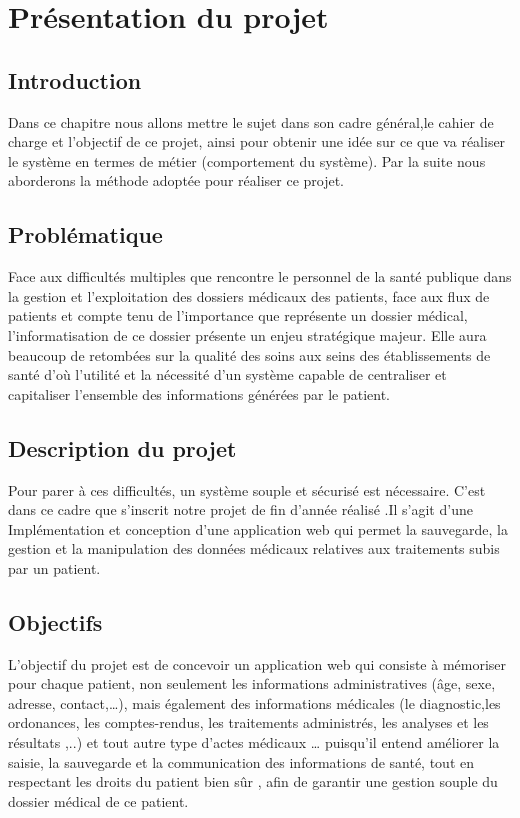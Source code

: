 \chapter{Présentation du projet}

\section{Introduction}

Dans ce chapitre nous allons mettre le sujet dans son cadre général,le cahier de charge  et l’objectif de ce projet, ainsi pour obtenir une idée sur ce que va réaliser le système en termes de métier (comportement du système). Par la suite nous aborderons la méthode adoptée pour réaliser ce
projet.


\section{Problématique}


Face aux difficultés multiples que rencontre le personnel de la santé publique dans la gestion
 et l’exploitation des dossiers médicaux des patients, face aux flux de patients et compte tenu de l’importance que représente un dossier médical, l’informatisation de ce dossier présente un
enjeu stratégique majeur.
 Elle aura beaucoup de retombées sur la qualité des soins aux seins des établissements de santé d’où l’utilité et la nécessité d’un système capable de centraliser et capitaliser l’ensemble des informations générées par le patient.
 
 
\section{Description du projet}

Pour parer à ces difficultés, un système souple et sécurisé est nécessaire.
 C’est dans ce cadre que s’inscrit notre projet de fin d’année réalisé .Il s’agit d’une
Implémentation et conception d’une application web qui permet la sauvegarde, la gestion
et la manipulation des données médicaux relatives aux traitements subis par un patient.



\section{Objectifs}


L’objectif du projet est de concevoir un application web qui consiste à mémoriser
pour chaque patient, non seulement les informations administratives (âge, sexe, adresse,
contact,…), mais également des informations médicales (le diagnostic,les ordonances,
les comptes-rendus, les traitements administrés, les analyses et les résultats ,..) et tout
autre type d’actes médicaux … puisqu'il entend améliorer la saisie, la sauvegarde
et la communication des informations de santé, tout en respectant les droits du patient bien sûr , afin de garantir une gestion souple du dossier médical de ce patient.


